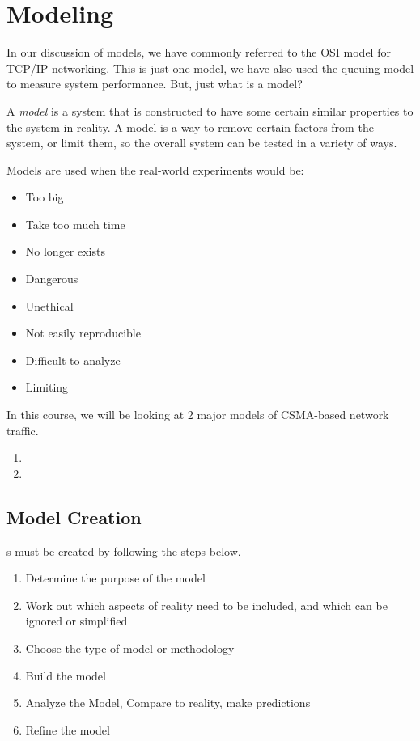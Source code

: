 \section{Modeling}\label{sec:Modeling}
In our discussion of models, we have commonly referred to the OSI model for TCP/IP networking.
This is just one model, we have also used the queuing model to measure system performance.
But, just what is a model?
\begin{definition}[Model]\label{def:Model}
  A \emph{model} is a system that is constructed to have some certain similar properties to the system in reality.
  A model is a way to remove certain factors from the system, or limit them, so the overall system can be tested in a variety of ways.
\end{definition}

Models are used when the real-world experiments would be:
\begin{itemize}[noitemsep]
\item Too big
\item Take too much time
\item No longer exists
\item Dangerous
\item Unethical
\item Not easily reproducible
\item Difficult to analyze
\item Limiting
\end{itemize}

In this course, we will be looking at 2 major models of CSMA-based network traffic.
\begin{enumerate}[noitemsep]
\item {}
\item {}
\end{enumerate}

\subsection{Model Creation}\label{subsec:Model_Creation}
s must be created by following the steps below.
\begin{enumerate}[noitemsep]
\item Determine the purpose of the model
\item Work out which aspects of reality need to be included, and which can be ignored or simplified
\item Choose the type of model or methodology
\item Build the model
\item Analyze the Model, Compare to reality, make predictions
\item Refine the model
\end{enumerate}

